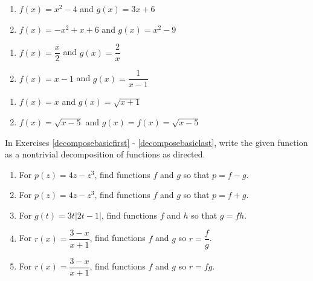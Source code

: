 \documentclass{ximera}
\begin{document}
\begin{enumerate}
\setcounter{enumi}{\value{HW}}

\item $f(x) = x^2-4$ and $g(x) = 3x+6$
\item $f(x) = -x^2+x+6$ and $g(x) = x^2-9$

\setcounter{HW}{\value{enumi}}
\end{enumerate}

\begin{enumerate}
\setcounter{enumi}{\value{HW}}

\item $f(x) = \dfrac{x}{2}$ and $g(x) = \dfrac{2}{x}$
\item $f(x) =x-1$ and $g(x) = \dfrac{1}{x-1}$

\setcounter{HW}{\value{enumi}}
\end{enumerate}

\begin{enumerate}
\setcounter{enumi}{\value{HW}}

\item $f(x) = x$ and $g(x) = \sqrt{x+1}$
\item $f(x) =\sqrt{x-5}$ and $g(x) = f(x) = \sqrt{x-5}$ \label{basicarithtwolast}

\setcounter{HW}{\value{enumi}}
\end{enumerate}

In Exercises \ref{decomposebasicfirst} - \ref{decomposebasiclast}, write the given function as a nontrivial decomposition of functions as directed.

\begin{enumerate}
\setcounter{enumi}{\value{HW}}

\item  For $p(z) = 4z-z^3$, find functions $f$ and $g$ so that $p=f-g$. \label{decomposebasicfirst}
\item  For $p(z) = 4z-z^3$, find functions $f$ and $g$ so that $p=f+g$.
\item  For $g(t) = 3t|2t-1|$, find functions $f$ and $h$  so that $g = fh$.
\item  For $r(x) = \dfrac{3-x}{x+1}$, find functions $f$ and $g$ so $r = \dfrac{f}{g}$.
\item  For $r(x) = \dfrac{3-x}{x+1}$, find functions $f$ and $g$ so $r = fg$. \label{decomposebasiclast}

\setcounter{HW}{\value{enumi}}
\end{enumerate}
\end{document}
